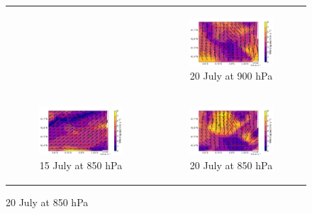 \begin{figure}[hbtp]
\begin{tabular}{cc}
\begin{subfigure}[t]{0.5\textwidth}
        \end{subfigure} &
        \begin{subfigure}[t]{0.5\textwidth}
            \caption{20 July at 900 hPa}
            \includegraphics[width=\textwidth]{images/chap5/IOP_maps/mesoNH_wind_900_2021-07-20T12:00:00.png}
        \end{subfigure} \\
        \begin{subfigure}[t]{0.5\textwidth}
            \caption{15 July at 850 hPa}
            \includegraphics[width=\textwidth]{images/chap5/IOP_maps/mesoNH_wind_850_2021-07-15T12:00:00.png}
        \end{subfigure} &
        \begin{subfigure}[t]{0.5\textwidth}
            \caption{20 July at 850 hPa}
            \includegraphics[width=\textwidth]{images/chap5/IOP_maps/mesoNH_wind_850_2021-07-20T12:00:00.png}

\end{subfigure}
\end{tabular}
\end{figure}
